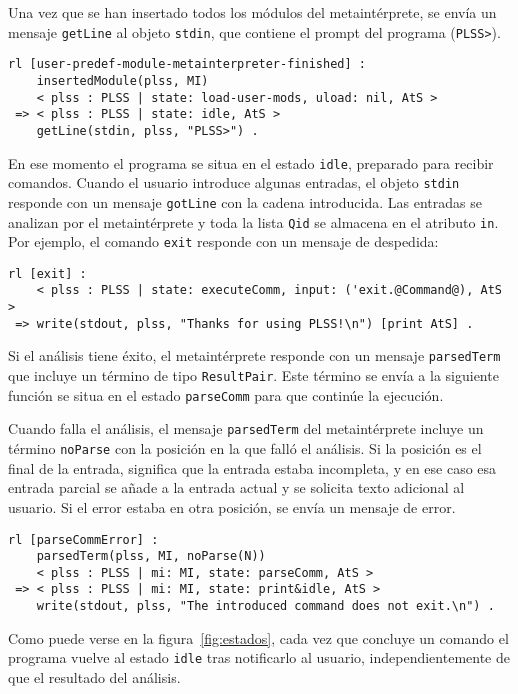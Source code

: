 Una vez que se han insertado todos los módulos del metaintérprete, se envía un mensaje \texttt{getLine} al objeto \texttt{stdin}, que contiene el prompt del programa (\texttt{PLSS>}).
\begin{lstlisting}[language=Maude]
 rl [user-predef-module-metainterpreter-finished] :
    insertedModule(plss, MI)
    < plss : PLSS | state: load-user-mods, uload: nil, AtS >
 => < plss : PLSS | state: idle, AtS >
    getLine(stdin, plss, "PLSS>") .
\end{lstlisting}
\medskip

En ese momento el programa se situa en el estado \texttt{idle}, preparado para recibir comandos.
Cuando el usuario introduce algunas entradas, el objeto \texttt{stdin} responde con un mensaje \texttt{gotLine} con la cadena introducida. 
Las entradas se analizan por el metaintérprete y toda la lista \texttt{Qid} se almacena en el atributo \texttt{in}.
Por ejemplo, el comando \texttt{exit} responde con un mensaje de despedida:
\begin{lstlisting}[language=Maude]
 rl [exit] :
    < plss : PLSS | state: executeComm, input: ('exit.@Command@), AtS >
 => write(stdout, plss, "Thanks for using PLSS!\n") [print AtS] .
\end{lstlisting}
\medskip


Si el análisis tiene éxito, el metaintérprete responde con un mensaje \texttt{parsedTerm} que incluye un término de tipo \texttt{ResultPair}. 
Este término se envía a la siguiente función se situa en el estado \texttt{parseComm} para que continúe la ejecución.

Cuando falla el análisis, el mensaje \texttt{parsedTerm} del metaintérprete incluye un término \texttt{noParse} con la posición en la que falló el análisis. Si la posición es el final de la entrada, significa que la entrada estaba incompleta, y en ese caso esa entrada parcial se añade a la entrada actual y se solicita texto adicional al usuario. Si el error estaba en otra posición, se envía un mensaje de error.
\begin{lstlisting}[language=Maude]
 rl [parseCommError] :
    parsedTerm(plss, MI, noParse(N))
    < plss : PLSS | mi: MI, state: parseComm, AtS >
 => < plss : PLSS | mi: MI, state: print&idle, AtS >
    write(stdout, plss, "The introduced command does not exit.\n") .
\end{lstlisting}
\smallskip

Como puede verse en la figura~\ref{fig:estados}, cada vez que concluye un comando el programa vuelve al estado \texttt{idle} tras notificarlo al usuario, independientemente de que el resultado del análisis.
\medskip

